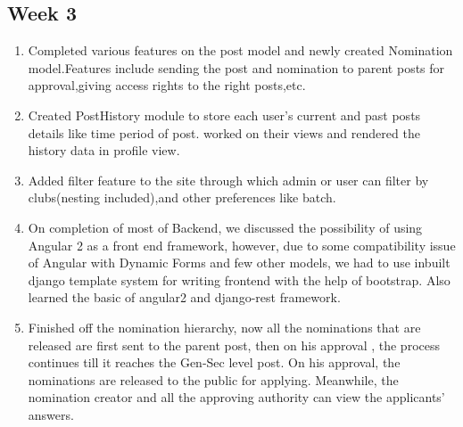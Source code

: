 \documentclass[12pt,a4paper]{scrartcl}
\begin{document}
\subsection{Week 3}
\begin{enumerate}
	\item Completed various features on the post model and newly created Nomination model.Features include sending the post and nomination to parent posts for approval,giving access rights to the right posts,etc.
	\item Created PostHistory module to store  each user's current and past posts details like time period of post. worked on their views and rendered the history data in profile view.
	\item Added filter feature to the site through which admin or user can filter by clubs(nesting included),and other preferences like batch.
	\item On completion of most of Backend, we discussed the possibility of using Angular 2 as a front end framework, however, due to some compatibility issue of Angular with Dynamic Forms and few other models, we had to use inbuilt django template system for writing frontend with the help of bootstrap. Also learned the basic of angular2 and django-rest framework.
	\item Finished off the nomination hierarchy, now all the nominations that are released are first sent to the parent post, then on his approval , the process continues till it reaches the Gen-Sec level post. On his approval, the nominations are released to the public for applying. Meanwhile, the nomination creator and all the approving authority can view the applicants’ answers.

\end{enumerate}
\end{document}

